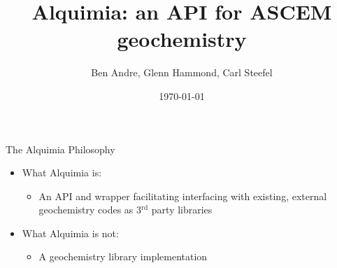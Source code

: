 \documentclass{beamer}
\newcommand\redcolor[1]{{{\color{red} #1}}}
\newcommand\bluecolor[1]{{{\color{blue} #1}}}
\begin{document}
\title[Alquimia]{Alquimia: an API for ASCEM geochemistry}
\author[]{Ben Andre, Glenn Hammond, Carl Steefel}
\date{\today}


\frame{\titlepage}

\begin{frame}{The Alquimia Philosophy}
\Large
\begin{itemize}
\item What Alquimia \bluecolor{is}:
\begin{itemize}
\Large
\item An API and wrapper facilitating interfacing with existing, external
      geochemistry codes as 3$^\text{rd}$ party libraries
\end{itemize}

\vspace{1cm}
\item What Alquimia \redcolor{is not}:
\begin{itemize}
\Large
\item A geochemistry library implementation
\end{itemize}
\end{itemize}
\end{frame}
\end{document}
